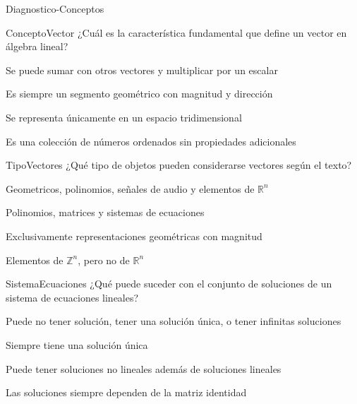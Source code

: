 \documentclass[a4,11pt]{aleph-notas}
\begin{document}
\begin{quiz}{Diagnostico-Conceptos}

\begin{multi}[]
    {ConceptoVector}
    ¿Cuál es la característica fundamental que define un vector en álgebra lineal?
    \item* Se puede sumar con otros vectores y multiplicar por un escalar
    \item Es siempre un segmento geométrico con magnitud y dirección
    \item Se representa únicamente en un espacio tridimensional
    \item Es una colección de números ordenados sin propiedades adicionales
\end{multi}

\begin{multi}[]
    {TipoVectores}
    ¿Qué tipo de objetos pueden considerarse vectores según el texto?
    \item Geometricos, polinomios, señales de audio y elementos de \( \mathbb{R}^n \)
    \item* Polinomios, matrices y sistemas de ecuaciones
    \item Exclusivamente representaciones geométricas con magnitud
    \item Elementos de \( \mathbb{Z}^n \), pero no de \( \mathbb{R}^n \)
\end{multi}

\begin{multi}[]
    {SistemaEcuaciones}
    ¿Qué puede suceder con el conjunto de soluciones de un sistema de ecuaciones lineales?
    \item* Puede no tener solución, tener una solución única, o tener infinitas soluciones
    \item Siempre tiene una solución única
    \item Puede tener soluciones no lineales además de soluciones lineales
    \item Las soluciones siempre dependen de la matriz identidad
\end{multi}

\end{quiz}
\end{document}
